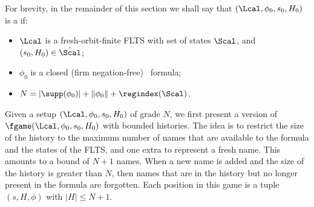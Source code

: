 For brevity, in the remainder of this section we shall say that $(\Lcal,\phi_0,s_0,H_0)$ is a  if:
\begin{itemize}
\item $\Lcal$ is a fresh-orbit-finite FLTS with set of states $\Scal$, and $(s_0,H_0)\in\hat \Scal$;
\item $\phi_0$ is a closed (firm negation-free) \fhml\ formula;
\item $N = |\supp(\phi_0)| + \|\phi_0\| + \regindex(\Scal)$. 
\end{itemize}
%
Given a setup $(\Lcal,\phi_0,s_0,H_0)$ of grade $N$, we first present a version of $\fgame(\Lcal,\phi_0,s_0,H_0)$ with bounded histories. 
The idea is to restrict the size of the history to the maximum number of names that are available to the formula and the states of the FLTS, and one extra to represent a fresh name. This amounts to a bound of $N+1$ names. 
When a new name is added and the size of the history is greater than $N$, then names that are in the history but no longer present in the formula are forgotten. 
Each position in this game is a tuple $(s, H, \phi)$ with $|H|\leq N+1$.
